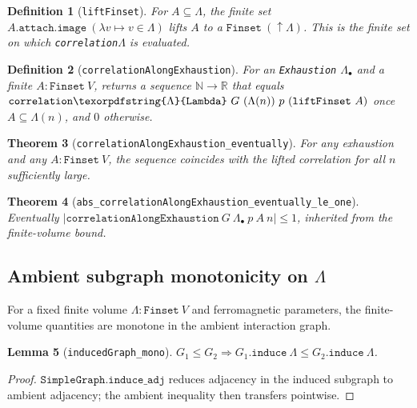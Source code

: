 \documentclass[a4paper,11pt]{article}
\newtheorem{theorem}{Theorem}
\newtheorem{lemma}[theorem]{Lemma}
\newtheorem{definition}[theorem]{Definition}
\newcommand{\LeanLambda}{\texorpdfstring{\ensuremath{\Lambda}}{Lambda}}
\begin{document}
\begin{definition}[\texttt{liftFinset}]
For $A \subseteq \Lambda$, the finite set
$A.\texttt{attach}.\texttt{image}~(\lambda v \mapsto v \in \Lambda)$
lifts $A$ to a $\texttt{Finset}~(\uparrow\!\Lambda)$.  This is the
finite set on which \texttt{correlation\LeanLambda} is evaluated.
\end{definition}

\begin{definition}[\texttt{correlationAlongExhaustion}]
For an \texttt{Exhaustion} $\Lambda_\bullet$ and a finite
$A : \texttt{Finset}~V$, returns a sequence
$\mathbb{N} \to \mathbb{R}$ that equals
$\texttt{correlation\LeanLambda}~G~(\Lambda(n))~p~(\texttt{liftFinset}~A)$
once $A \subseteq \Lambda(n)$, and $0$ otherwise.
\end{definition}

\begin{theorem}[\texttt{correlationAlongExhaustion\_eventually}]
For any exhaustion and any $A : \texttt{Finset}~V$, the sequence
coincides with the lifted correlation for all $n$ sufficiently large.
\end{theorem}

\begin{theorem}[\texttt{abs\_correlationAlongExhaustion\_eventually\_le\_one}]
Eventually $|\texttt{correlationAlongExhaustion}~G~\Lambda_\bullet~p~A~n|
\le 1$, inherited from the finite-volume bound.
\end{theorem}

\subsection{Ambient subgraph monotonicity on \texorpdfstring{$\Lambda$}{Lambda}}

For a fixed finite volume $\Lambda : \texttt{Finset}~V$ and
ferromagnetic parameters, the finite-volume quantities are monotone
in the ambient interaction graph.

\begin{lemma}[\texttt{inducedGraph\_mono}]
$G_1 \le G_2 \Rightarrow G_1.\texttt{induce}~\Lambda \le
G_2.\texttt{induce}~\Lambda$.
\end{lemma}

\begin{proof}
$\texttt{SimpleGraph.induce\_adj}$ reduces adjacency in the induced
subgraph to ambient adjacency; the ambient inequality then transfers
pointwise.
\end{proof}
\end{document}

